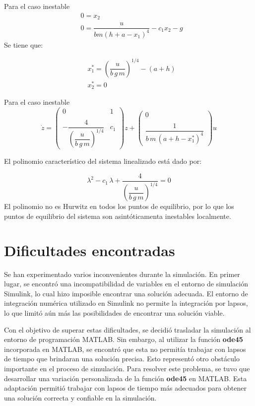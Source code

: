 Para el caso inestable
\begin{align*}
    &0=x_{2}\\
    &0=  \dfrac{u}{bm(h+a-x_{1})^4}-c_{1}x_{2} - g
\end{align*}
Se tiene que: 

\begin{align*}
    &x_{1}^{*}={{\left(\dfrac{u}{b\,g\,m}\right)}}^{1/4} -(a+h)\\
    &x^{*}_{2}=0
\end{align*}

Para el caso inestable
\begin{equation}
    \dot{z}=\left(\begin{array}{cc}
0 & 1\\\\
-\dfrac{4}{{{\left(\dfrac{u}{b\,g\,m}\right)}}^{1/4}} & c_{1}
\end{array}\right)z + \left(\begin{array}{c}
0\\\\
\dfrac{1}{b\,m\,{{\left(a+h-x^{*}_1 \right)}}^4 }
\end{array}\right)u
\end{equation}

El polinomio característico del sistema linealizado está dado por:

\begin{equation}
 \lambda^2 -c_{1}\,\lambda+\dfrac{4 }{{{\left(\dfrac{u}{b\,g\,m}\right)}}^{1/4}}=0 
\end{equation}
El polinomio no es Hurwitz en todos los puntos de equilibrio, por lo que los puntos de equilibrio del sistema son asintóticamenta inestables localmente.


\section{Dificultades encontradas}

Se han experimentado varios inconvenientes durante la simulación. En primer lugar, se encontró una incompatibilidad de variables en el entorno de simulación Simulink, lo cual hizo imposible encontrar una solución adecuada. El entorno de integración numérica utilizado en Simulink no permite la integración por lapsos, lo que limitó aún más las posibilidades de encontrar una solución viable.

Con el objetivo de superar estas dificultades, se decidió trasladar la simulación al entorno de programación MATLAB. Sin embargo, al utilizar la función \textbf{ode45} incorporada en MATLAB, se encontró que esta no permitía trabajar con lapsos de tiempo que brindaran una solución precisa. Esto representó otro obstáculo importante en el proceso de simulación. Para resolver este problema, se tuvo que desarrollar una variación personalizada de la función \textbf{ode45}  en MATLAB. Esta adaptación permitió trabajar con lapsos de tiempo más adecuados para obtener una solución correcta y confiable en la simulación.


